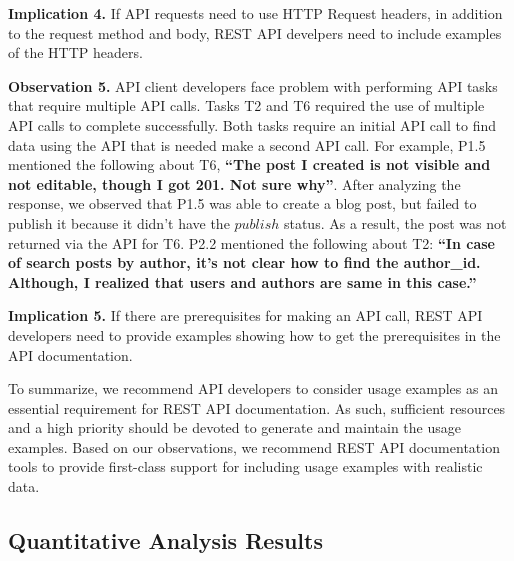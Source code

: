 \documentclass[conference]{IEEEtran}
\begin{document}
\textbf{Implication 4.} If API requests need to use HTTP Request headers, in addition to the request method and body, REST API develpers need to include examples of the HTTP headers.

\textbf{Observation 5.} API client developers face problem with performing API tasks that require multiple API calls. Tasks T2 and T6 required the use of multiple API calls to complete successfully. Both tasks require an initial API call to find data using the API that is needed make a second API call. For example, P1.5 mentioned the following about T6, \textbf{``The post I created is not visible and not editable, though I got 201. Not sure why''}. After analyzing the response, we observed that P1.5 was able to create a blog post, but failed to publish it because it didn't have the $publish$ status. As a result, the post was not returned via the API for T6. P2.2 mentioned the following about T2: \textbf{``In case of search posts by author, it's not clear how to find the author\_id. Although, I realized that users and authors are same in this case.''}

\textbf{Implication 5.} If there are prerequisites for making an API call, REST API developers need to provide examples showing how to get the prerequisites in the API documentation.


To summarize, we recommend API developers to consider usage examples as an essential requirement for REST API documentation. As such, sufficient resources and a high priority should be devoted to generate and maintain the usage examples. Based on our observations, we recommend REST API documentation tools to provide first-class support for including usage examples with realistic data.

\subsection{Quantitative Analysis Results} %

\pgfplotsset{compat=1.14}
\usetikzlibrary{patterns}
\groupone
\end{document}
